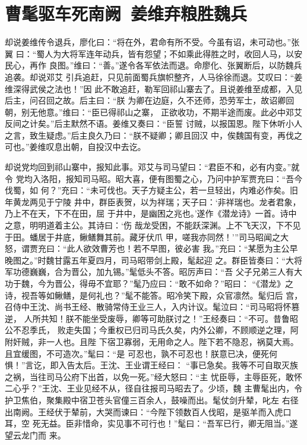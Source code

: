 \chapter{曹髦驱车死南阙~姜维弃粮胜魏兵}

却说姜维传令退兵，廖化曰：“将在外，君命有所不受。今虽有诏，未可动也。”张翼
曰：“蜀人为大将军连年动兵，皆有怨望；不如乘此得胜之时，收回人马，以安民心，再作
良图。”维曰：“善。”遂令各军依法而退。命廖化、张翼断后，以防魏兵追袭。却说邓艾
引兵追赶，只见前面蜀兵旗帜整齐，人马徐徐而退。艾叹曰：“姜维深得武侯之法也！”因
此不敢追赶，勒军回祁山寨去了。且说姜维至成都，入见后主，问召回之故。后主曰：“朕
为卿在边庭，久不还师，恐劳军士，故诏卿回朝，别无他意。”维曰：“臣已得祁山之寨，
正欲收功，不期半途而废。此必中邓艾反间之计矣。”后主默然不语。姜维又奏曰：“臣誓
讨贼，以报国恩。陛下休听小人之言，致生疑虑。”后主良久乃曰：“朕不疑卿；卿且回汉
中，俟魏国有变，再伐之可也。”姜维叹息出朝，自投汉中去讫。

却说党均回到祁山寨中，报知此事。邓艾与司马望曰：“君臣不和，必有内变。”就令
党均入洛阳，报知司马昭。昭大喜，便有图蜀之心，乃问中护军贾充曰：“吾今伐蜀，如
何？”充曰：“未可伐也。天子方疑主公，若一旦轻出，内难必作矣。旧年黄龙两见于宁陵
井中，群臣表贺，以为祥瑞；天子曰：‘非祥瑞也。龙者君象，乃上不在天，下不在田，屈
于井中，是幽困之兆也。’遂作《潜龙诗》一首。诗中之意，明明道着主公。其诗曰：‘伤
哉龙受困，不能跃深渊。上不飞天汉，下不见于田。蟠居于井底，鳅鳝舞其前。藏牙伏爪
甲，嗟我亦同然！’”司马昭闻之大怒，谓贾充曰：“此人欲效曹芳也！若不早图，彼必害
我。”充曰：“某愿为主公早晚图之。”时魏甘露五年夏四月，司马昭带剑上殿，髦起迎
之。群臣皆奏曰：“大将军功德巍巍，合为晋公，加九锡。”髦低头不答。昭厉声曰：“吾
父子兄弟三人有大功于魏，今为晋公，得毋不宜耶？”髦乃应曰：“敢不如命？”昭曰：
“《潜龙》之诗，视吾等如鳅鳝，是何礼也？”髦不能答。昭冷笑下殿，众官凛然。髦归后
宫，召侍中王沈、尚书王经、散骑常侍王业三人，入内计议。髦泣曰：“司马昭将怀篡逆，
人所共知！朕不能坐受废辱，卿等可助朕讨之！”王经奏曰：“不可。昔鲁昭公不忍季氏，
败走失国；今重权已归司马氏久矣，内外公卿，不顾顺逆之理，阿附奸贼，非一人也。且陛
下宿卫寡弱，无用命之人。陛下若不隐忍，祸莫大焉。且宜缓图，不可造次。”髦曰：“是
可忍也，孰不可忍也！朕意已决，便死何惧！”言讫，即入告太后。王沈、王业谓王经曰：
“事已急矣。我等不可自取灭族之祸，当往司马公府下出首，以免一死。”经大怒曰：“主
忧臣辱，主辱臣死，敢怀二心乎？”王沈、王业见经不从，径自往报司马昭去了。少顷，魏
主曹髦出内，令护卫焦伯，聚集殿中宿卫苍头官僮三百余人，鼓噪而出。髦仗剑升辇，叱左
右径出南阙。王经伏于辇前，大哭而谏曰：“今陛下领数百人伐昭，是驱羊而入虎口耳，空
死无益。臣非惜命，实见事不可行也！”髦曰：“吾军已行，卿无阻当。”遂望云龙门而
来。

